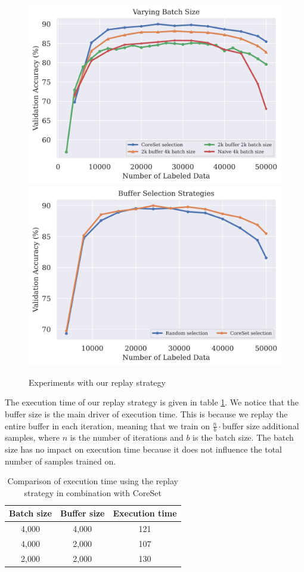 \begin{figure}[h]
    \centering
    \includegraphics[width=0.45\linewidth]{images/results_CAL/replay_varying_batch_size.png} \hfill
    \includegraphics[width=0.45\linewidth]{images/results_CAL/replay_buffer_selection.png}
    \caption{Experiments with our replay strategy}
    \label{fig:Evaluation:CAL:Replay}
\end{figure}

The execution time of our replay strategy is given in table \ref{fig:Evaluation:CAL:Replay_Time}. We notice that the buffer size is the main driver of execution time. This is because
we replay the entire buffer in each iteration, meaning that we train on $\frac{n}{b} \cdot \text{buffer size}$ additional samples, where $n$ is the number of iterations and $b$ is
the batch size. The batch size has no impact on execution time because it does not influence the total number of samples trained on. \par

\begin{table}[h]
    \centering
    \begin{tabular}{c | c  c} 
        Batch size & Buffer size & Execution time\\ 
        \hline 
        4,000 & 4,000 & 121 \\
        4,000 & 2,000 & 107 \\
        2,000 & 2,000 & 130 \\
    \end{tabular}
    \caption{Comparison of execution time using the replay strategy in combination with CoreSet}
    \label{fig:Evaluation:CAL:Replay_Time}
\end{table}


